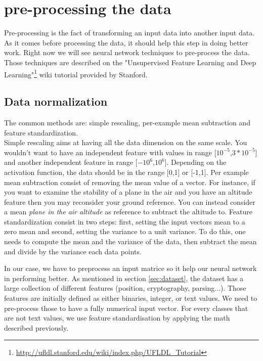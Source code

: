 




\section{pre-processing the data}
\label{sec:preprocessing}

	Pre-processing is the fact of transforming an input data into another input data. As it comes before processing the data, it should help this step in doing better work.
	Right now we will see neural network techniques to pre-process the data. Those techniques are described on the "Unsupervised Feature Learning and Deep Learning"\footnote{\url{http://ufldl.stanford.edu/wiki/index.php/UFLDL_Tutorial}} wiki tutorial provided by Stanford.

	\subsection{Data normalization}
		The common methods are: simple rescaling, per-example mean subtraction and feature standardization.\\
		Simple rescaling aims at having all the data dimension on the same scale. You wouldn't want to have an independent feature with values in range [$10^{-5}$,$3*10^{-5}$] and another independent feature in range [$-10^{6}$,$10^{6}$]. Depending on the activation function, the data should be in the range [0,1] or [-1,1].
		Per example mean subtraction consist of removing the mean value of a vector. For instance, if you want to examine the stability of a plane in the air and you have an altitude feature then you may reconsider your ground reference. You can instead consider a mean \textit{plane in the air altitude} as reference to subtract the altitude to.
		Feature standardization consist in two steps: first, setting the input vectors mean to a zero mean and second, setting the variance to a unit variance. To do this, one needs to compute the mean and the variance of the data, then subtract the mean and divide by the variance each data points.



	In our case, we have to preprocess an input matrice so it help our neural network in performing better.
	As mentioned in section \ref{sec:dataset}, the dataset has a large collection of different features (position, cryptography, parsing...). Those features are initially defined as either binaries, integer, or text values. We need to pre-process those to have a fully numerical input vector. For every classes that are not text values, we use feature standardisation by applying the math described previously.





